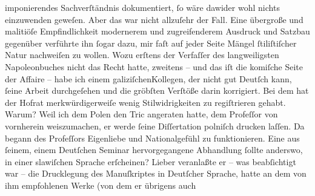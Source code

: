 \begin{ledgroupsized}[t]{13cm}
               imponierendes Sachverſtändnis dokumentiert, ſo wäre dawider wohl nichts einzuwenden
               geweſen. Aber das war nicht allzuſehr der Fall. Eine übergroße und malitiöſe
               Empfindlichkeit modernerem und zugreifenderem Ausdruck und Satzbau gegenüber
               verführte ihn ſogar dazu, mir faſt auf jeder Seite Mängel ſtiliſtiſcher Natur
               nachweiſen zu wollen. Wozu erſtens der Verfaſſer des langweiligsten Napoleonbuches nicht das Recht hatte,
               zweitens – und das iſt die komiſche Seite der Affaire – habe ich einem galiziſchenKollegen, der nicht gut
               Deutſch kann, ſeine Arbeit durchgeſehen und die gröbſten Verſtöße darin korrigiert.
               Bei dem hat der Hofrat
               merkwürdigerweiſe wenig Stilwidrigkeiten zu regiſtrieren gehabt. Warum? Weil ich dem
                  Polen den Tric angeraten hatte, dem Profeſſor von vornherein
               weiszumachen, er werde ſeine Diſſertation polniſch drucken laſſen. Da begann des Profeſſors Eigenliebe und Nationalgefühl zu funktionieren.
               Eine aus ſeinem, einem Deutſchen Seminar hervorgegangene Abhandlung ſollte anderswo,
               in einer slawiſchen Sprache erſcheinen? Lieber veranlaßte er – was beabſichtigt war –
               die Drucklegung des Manuſkriptes in Deutſcher Sprache, {\pb}hatte an dem von ihm empfohlenen Werke (von dem er übrigens auch

\end{ledgroupsized}
